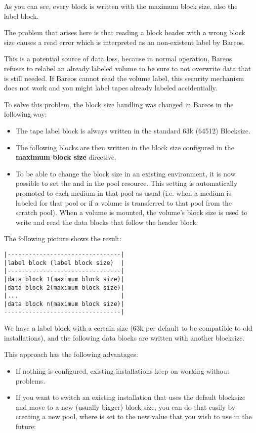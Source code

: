 As you can see, every block is written with the maximum block size, also the label block.

The problem that arises here is that reading a block header with a wrong block size causes
a read error which is interpreted as an non-existent label by Bareos.

This is a potential source of data loss, because in normal operation, Bareos refuses to
relabel an already labeled volume to be sure to not overwrite data that is still needed.
If Bareos cannot read the volume label, this security mechanism does not work and you might
label tapes already labeled accidentially.

To solve this problem, the block size handling was changed in Bareos  in the following way:
\begin{itemize}
\item  The tape label block is always written in the standard 63k (64512) Blocksize.
\item  The following blocks are then written in the block size configured in the {\bf maximum block size} directive.
\item  To be able to change the block size in an existing environment, it is now
possible to set the  and  in the
pool resource. This setting is automatically promoted to each medium in
that pool as usual (i.e. when a medium is labeled for that pool or if a volume is transferred to that pool from the scratch pool).
When a volume is mounted, the volume's block size is
used to write and read the data blocks that follow the header block.
\end{itemize}

The following picture shows the result:
\begin{verbatim}
|--------------------------------|
|label block (label block size)  |
|--------------------------------|
|data block 1(maximum block size)|
|data block 2(maximum block size)|
|...                             |
|data block n(maximum block size)|
---------------------------------|
\end{verbatim}
We have a label block with a certain size (63k per default to be compatible to old installations),
and the following data blocks are written with another blocksize.


This approach has the following advantages:
\begin{itemize}
\item If nothing is configured, existing installations keep on working without problems.
\item If you want to switch an existing installation that uses the default
blocksize and move to a new (usually bigger) block size, you can do that
easily by creating a new pool, where  is set to the new
value that you wish to use in the future:
\end{itemize}


